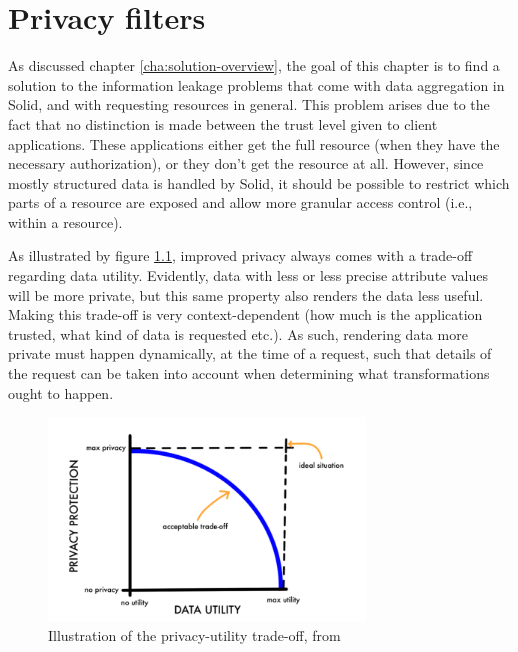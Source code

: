 \chapter{Privacy filters}
\label{cha:privacy-filters}
As discussed chapter \ref{cha:solution-overview}, the goal of this chapter is to find a solution to the information leakage problems that come with data aggregation in Solid, and with requesting resources in general. This problem arises due to the fact that no distinction is made between the trust level given to client applications. These applications either get the full resource (when they have the necessary authorization), or they don't get the resource at all. However, since mostly structured data is handled by Solid, it should be possible to restrict which parts of a resource are exposed and allow more granular access control (i.e., within a resource).

As illustrated by figure \ref{fig:privacy-utility-tradeoff}, improved privacy always comes with a trade-off regarding data utility. Evidently, data with less or less precise attribute values will be more private, but this same property also renders the data less useful. Making this trade-off is very context-dependent (how much is the application trusted, what kind of data is requested etc.). As such, rendering data more private must happen dynamically, at the time of a request, such that details of the request can be taken into account when determining what transformations ought to happen.
\begin{figure}[H]
    \centering
    \includegraphics[width=0.75\textwidth]{images/privacy-filter/Data-Privacy-Protection-versus-Data-Utility.png}
    \caption{Illustration of the privacy-utility trade-off, from \citet{datasharing-implications}}
    \label{fig:privacy-utility-tradeoff}
\end{figure}

